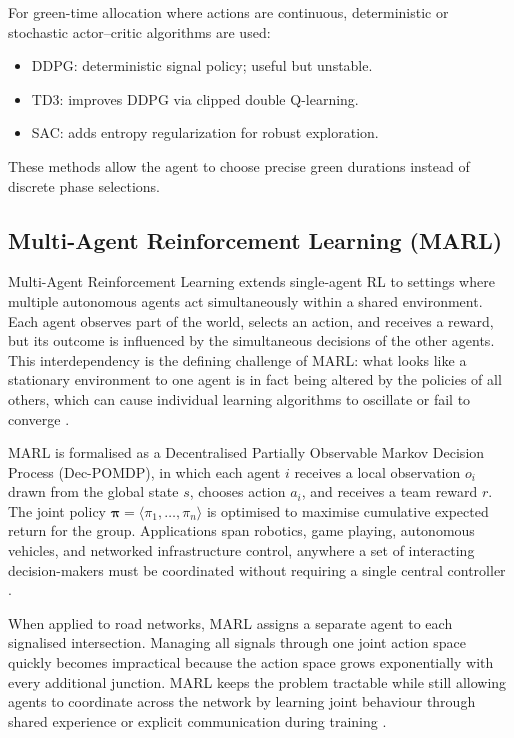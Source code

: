 ﻿\documentclass[11pt, a4paper]{report}
\begin{document}
For green-time allocation where actions are continuous, deterministic or stochastic actor--critic algorithms are used:

\begin{itemize}
    \item DDPG: deterministic signal policy; useful but unstable.
    \item TD3: improves DDPG via clipped double Q-learning.
    \item SAC: adds entropy regularization for robust exploration.
\end{itemize}

These methods allow the agent to choose precise green durations instead of discrete phase selections.

\subsection{Multi-Agent Reinforcement Learning (MARL)}

Multi-Agent Reinforcement Learning extends single-agent RL to settings where multiple autonomous agents act simultaneously within a shared environment. Each agent observes part of the world, selects an action, and receives a reward, but its outcome is influenced by the simultaneous decisions of the other agents. This interdependency is the defining challenge of MARL: what looks like a stationary environment to one agent is in fact being altered by the policies of all others, which can cause individual learning algorithms to oscillate or fail to converge \cite{busoniu2008comprehensive}.

MARL is formalised as a Decentralised Partially Observable Markov Decision Process (Dec-POMDP), in which each agent $i$ receives a local observation $o_i$ drawn from the global state $s$, chooses action $a_i$, and receives a team reward $r$. The joint policy $\boldsymbol{\pi} = \langle \pi_1, \ldots, \pi_n \rangle$ is optimised to maximise cumulative expected return for the group. Applications span robotics, game playing, autonomous vehicles, and networked infrastructure control, anywhere a set of interacting decision-makers must be coordinated without requiring a single central controller \cite{busoniu2008comprehensive}.

When applied to road networks, MARL assigns a separate agent to each signalised intersection. Managing all signals through one joint action space quickly becomes impractical because the action space grows exponentially with every additional junction. MARL keeps the problem tractable while still allowing agents to coordinate across the network by learning joint behaviour through shared experience or explicit communication during training \cite{busoniu2008comprehensive}.
\end{document}
